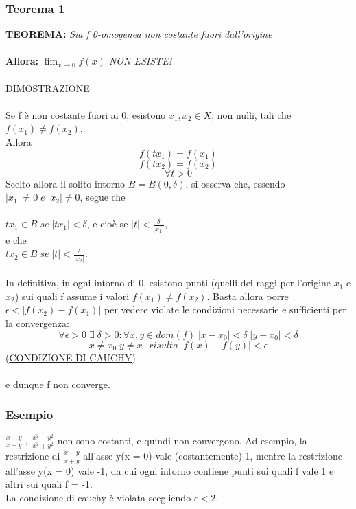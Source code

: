 \documentclass[fontsize = 20px, paper = a4]{article}
\begin{document}
\subsubsection{Teorema 1}
\textbf{TEOREMA: } \emph{Sia f 0-omogenea non costante fuori dall'origine }\\ \\
\textbf{Allora: } \emph{$\lim_{x \to 0}f(x)$ NON ESISTE!}\\ \\
\underline{DIMOSTRAZIONE}\\ \\
Se f è non costante fuori ai 0, esistono $x_1 , x_2 \in X$, non nulli,  tali che $f(x_1) \neq f(x_2)$. \\
Allora
$$f(tx_1) = f(x_1)$$
$$f(tx_2) = f(x_2)$$
$$\forall t > 0$$
Scelto allora il solito intorno $B = B(0,\delta)$, si osserva che, essendo $|x_1| \neq 0 \; e \; |x_2| \neq 0$, segue che
 \\ \\
 \hspace*{3cm }$tx_1 \in B \; se \; |tx_1| < \delta $, e cioè se $|t| < \frac{\delta}{|x_1|}$, 
\\ 
 e che 
\\ 
\hspace*{3cm} $tx_2 \in B \; se \;|t| < \frac{\delta}{|x_2|} $. \\ \\
In definitiva, in ogni intorno di 0, esistono punti (quelli dei raggi per l'origine $x_1$ e $x_2$) sui quali f assume i valori $f(x_1) \neq f(x_2)$. Basta allora porre $\epsilon < |f(x_2) - f(x_1)| $ per vedere violate le condizioni necessarie e sufficienti per la convergenza:
$$\forall \epsilon > 0 \; \exists \; \delta > 0 : \forall x,y \in dom(f) \; |x - x_0| < \delta \; |y - x_0| < \delta$$
$$x \neq x_0 \; y \neq  x_0 \; risulta \; |f(x) - f(y)| < \epsilon$$
\hspace{3.7cm}(\underline{CONDIZIONE DI CAUCHY})\\\\
e dunque f non converge.
\subsubsection{Esempio}
$\frac{x-y}{x + y} \; , \; \frac{x^2 - y^2}{x^2 + y^2}$ non sono costanti, e quindi non convergono. Ad esempio, la restrizione di $\frac{x - y}{x + y}$ all'asse y(x = 0) vale (costantemente) 1, mentre la restrizione all'asse y(x = 0) vale -1, da cui ogni intorno contiene punti sui quali f vale 1 e altri sui quali f = -1. \\
La condizione di cauchy è violata scegliendo $\epsilon < 2$.
\end{document}
